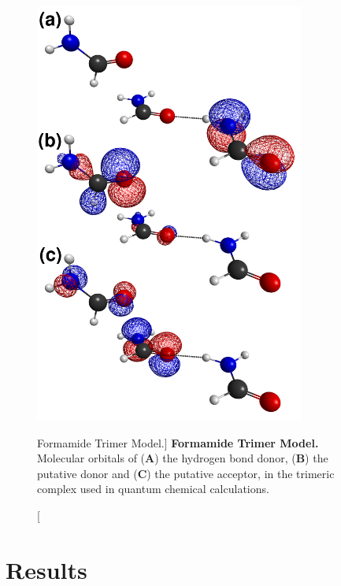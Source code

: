 \begin{figure}
\includegraphics[width=3.5in]{figs/npistar/04-orbitals.png}
\caption
      [Formamide Trimer Model.]{
  {\bf Formamide Trimer Model.}
  \\
  Molecular orbitals of ({\bf A}) the hydrogen bond donor, ({\bf B}) the
  putative \npipistar{} donor and ({\bf C}) the putative \npipistar{} acceptor,
  in the trimeric complex used in quantum chemical calculations.
}
\end{figure}

\section{Results}


